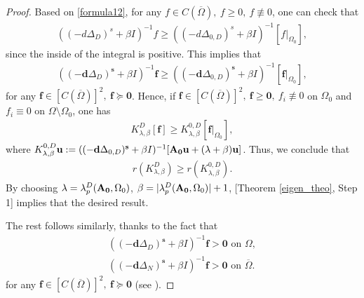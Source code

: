 \documentclass[a4paper,11pt]{amsart}
\theoremstyle{definition}
\def\O{\Omega}
\numberwithin{equation}{section}
\theoremstyle{definition}
\def\O{\Omega}
\begin{document}
\begin{proof}
 Based on \eqref{formula12}, for any $f\in C(\overline{\O}),~f\geq 0,~f\not\equiv 0$, one can check that
\begin{align*}
\left((-d\Delta_D)^s+\beta I\right)^{-1}f\geq \left((-d\Delta_{0,D})^s+\beta I\right)^{-1}[f|_{\Omega_0}],
\end{align*}
since the inside of the integral is positive. This implies that
\begin{align*}
((-\textbf{d}\Delta_D)^{\textbf{s}}+\beta I)^{-1}\textbf{f}\geq ((-\textbf{d}\Delta_{0,D})^{\textbf{s}}+\beta I)^{-1}[\textbf{f}|_{\Omega_0}],
\end{align*}
for any $\textbf{f}\in [C(\overline{\O})]^2,~\textbf{f}\succeq  \textbf{0}$.  Hence, if $\textbf{f}\in [C(\overline{\O})]^2,~\textbf{f}\geq \textbf{0},~f_i\not\equiv 0$ on $\O_0$ and $f_i\equiv 0$ on $\O\setminus \O_0$, one has
\begin{align*}
K^D_{\lambda,\beta}[\textbf{f}]\geq  	K^{0,D}_{\lambda,\beta}[\textbf{f}|_{\O_0}],
\end{align*}
where $K_{\lambda,\beta}^{0,D}\textbf{u}:=((-\textbf{d}\Delta_{0,D})^{\textbf{s}}+\beta I)^{-1}[{\bf A_0u}+(\lambda+\beta)\textbf{u}]$. Thus, we conclude that
\begin{align*}
r(K^D_{\lambda,\beta})\geq r(K^{0,D}_{\lambda,\beta}).
\end{align*}
By choosing $\lambda=\lambda^D_p({\bf A_0},\O_0)$, $\beta = |\lambda^D_p({\bf A_0},\O_0)|+1$, [Theorem \ref{eigen_theo}, Step 1] implies  that the desired result.

The rest follows similarly, thanks to the fact that
\begin{align*}
((-\textbf{d}\Delta_D)^{\textbf{s}}+\beta I)^{-1}\textbf{f}>\textbf{0} \text{ on }\O,\\
((-\textbf{d}\Delta_N)^{\textbf{s}}+\beta I)^{-1}\textbf{f}>\textbf{0} \text{ on }\overline{\O}.
\end{align*}
for any $\textbf{f}\in [C(\overline{\O})]^2,~\textbf{f}\succeq  \textbf{0}$ (see \cite[Theorem 3.1, Step 3, Case 1]{zhao_spatiotemporal_2025}).


\end{proof}
\end{document}
